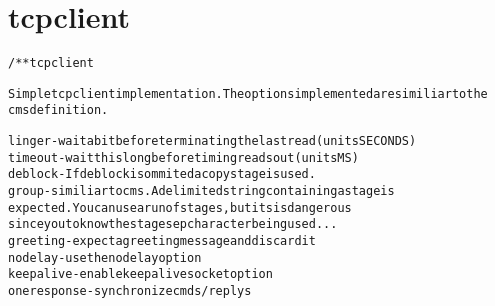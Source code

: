 \section{tcpclient}
\begin{shaded}
\begin{alltt}
/** tcpclient

Simple tcpclient implementation.  The options implemented are similiar to the
cms definition.

linger      - wait a bit before terminating the last read (units SECONDS)
timeout     - wait this long before timing reads out (units MS)
deblock     - If deblock is ommited a copy stage is used.
group       - similiar to cms.  A delimited string containing a stage is
              expected.  You can use a run of stages, but its is dangerous
              since you to know the stage sep character being used...
greeting    - expect a greeting message and discard it
nodelay     - use the nodelay option
keepalive   - enable keep alive socket option
oneresponse - synchronize cmds/replys

\end{alltt}
\end{shaded}
